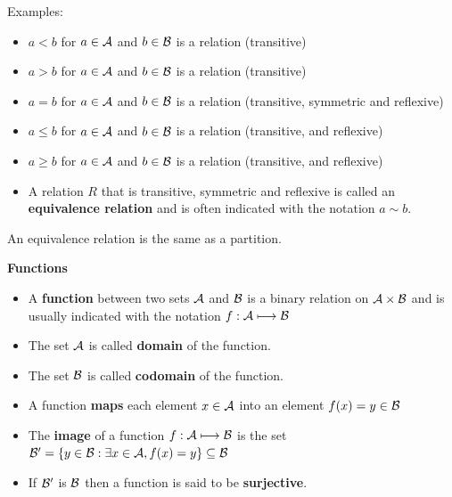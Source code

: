 \documentclass[justified, sixbynine]{tufte-book}
\def\subsubsection#1{{\bf #1}}
\theoremstyle{plain}%
\newtheorem * {corollary}{Corollary}
\theoremstyle{definition}
\theoremstyle{remark}
\newtheorem * {remark}{Remark}
\newtheorem * {note}{Note}
\begin{document}
\begin{fullwidth}
Examples:

\begin{itemize}
\item
$a<b$ for $a\in {\cal A}$ and $b\in {\cal B}$ is a relation (transitive)
\item
$a>b$ for $a\in {\cal A}$ and $b\in {\cal B}$ is a relation (transitive)
\item
$a=b$ for $a\in {\cal A}$ and $b\in {\cal B}$ is a relation (transitive,
symmetric and reflexive)
\item
$a\leq b$ for $a\in {\cal A}$ and $b\in {\cal B}$ is a relation (transitive,
and reflexive)
\item
$a\geq b$ for $a\in {\cal A}$ and $b\in {\cal B}$ is a relation (transitive,
and reflexive)
\item  A relation $R$ that is transitive, symmetric and reflexive is called
an {\bf equivalence relation} and is often indicated with the notation $a\sim b$.
\end{itemize}

An equivalence relation is the same as a partition.

\subsubsection{Functions}

\begin{itemize}
\item  A {\bf function} between two sets ${\cal A}$ and ${\cal B}$ is a
binary relation on ${\cal A}\times {\cal B}$ and is usually indicated with
the notation $f:{\cal A}\longmapsto {\cal B}$

\item  The set ${\cal A}$ is called {\bf domain} of the function.

\item  The set ${\cal B}$ is called {\bf codomain} of the function.

\item  A function {\bf maps} each element $x\in {\cal A}$ into an element $%
f(x)=y\in {\cal B}$

\item  The {\bf image} of a function $f:{\cal A}\longmapsto {\cal B}$ is the
set ${\cal B}^{\prime }=\{y\in {\cal B}:\exists x\in {\cal A}%
, f(x)=y\}\subseteq {\cal B}$

\item  If ${\cal B}^{\prime }$ is ${\cal B}$ then a function is said to be
{\bf surjective}.


\end{itemize}
\end{fullwidth}
\end{document}
